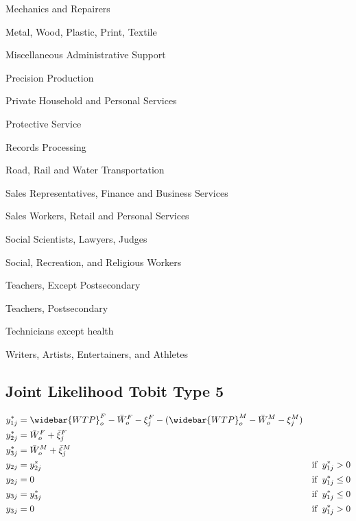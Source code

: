 \documentclass[12pt]{article}
\begin{document}
   Mechanics and Repairers
   
   Metal, Wood, Plastic, Print, Textile
   
   Miscellaneous Administrative Support
   
   Precision Production
   
   Private Household and Personal Services
   
   Protective Service
   
   Records Processing
   
   Road, Rail and Water Transportation
   
   Sales Representatives, Finance and Business Services
   
   Sales Workers, Retail and Personal Services
   
   Social Scientists, Lawyers, Judges
   
   Social, Recreation, and Religious Workers
   
   Teachers, Except Postsecondary
   
   Teachers, Postsecondary
   
   Technicians except health
   
   Writers, Artists, Entertainers, and Athletes
   
   
 \subsection{Joint Likelihood Tobit Type 5}\label{sec.likelihood}


\begin{align*}
y_{1j}^* &= \widebar{WTP}^F_o - \bar{W}^F_o  - \xi^F_j - (\widebar{WTP}^M_o - \bar{W}^M_o  - \xi^M_j) \\
y_{2j}^* &= \bar{W}^F_o + \bar{\xi}^F_j \\
y_{3j}^* &= \bar{W}^M_o + \bar{\xi}^M_j \\
y_{2j} &= y_{2j}^* \hspace{10mm} &\text{if} \hspace{2mm} y_{1j}^* >0 \\
y_{2j} &= 0 \hspace{10mm} &\text{if} \hspace{2mm} y_{1j}^* \leq 0 \\
y_{3j} &= y_{3j}^* \hspace{10mm} &\text{if} \hspace{2mm} y_{1j}^* \leq 0 \\
y_{3j} &= 0 \hspace{10mm} &\text{if} \hspace{2mm} y_{1j}^* > 0 \\
\end{align*}
\end{document}
